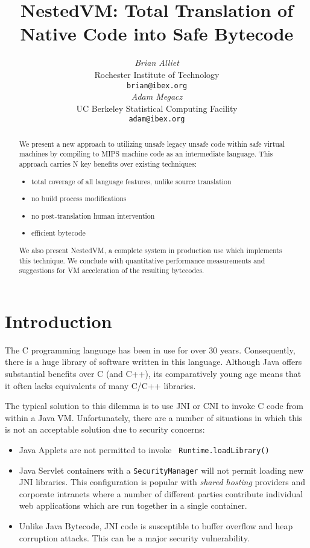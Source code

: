 \documentclass{acmconf}
\title{\textbf{\textsf{
NestedVM: Total Translation of Native Code into Safe Bytecode
}}}
\date{}
\author{\begin{tabular}{@{}c@{}}
        {\em {Brian Alliet}} \\
        {Rochester Institute of Technology}\\
        {\tt brian@ibex.org}
   \end{tabular}\hskip 1in\begin{tabular}{@{}c@{}}
        {\em {Adam Megacz}} \\
        {UC Berkeley Statistical Computing Facility} \\
        {\tt adam@ibex.org}
\end{tabular}}
\begin{document}
\maketitle

\begin{abstract}

We present a new approach to utilizing unsafe legacy unsafe code
within safe virtual machines by compiling to MIPS machine code as an
intermediate language.  This approach carries N key benefits over
existing techniques:

\begin{itemize}
\item total coverage of all language features, unlike source translation
\item no build process modifications
\item no post-translation human intervention
\item efficient bytecode
\end{itemize}

We also present NestedVM, a complete system in production use which
implements this technique.  We conclude with quantitative performance
measurements and suggestions for VM acceleration of the resulting
bytecodes.


\end{abstract}

\section{Introduction}

The C programming language \cite{KR} has been in use for over 30
years.  Consequently, there is a huge library of software written in
this language.  Although Java offers substantial benefits \cite{} over
C (and C++), its comparatively young age means that it often lacks
equivalents of many C/C++ libraries.

The typical solution to this dilemma is to use JNI \cite{} or CNI
\cite{} to invoke C code from within a Java VM.  Unfortunately, there
are a number of situations in which this is not an acceptable
solution due to security concerns:

\begin{itemize}

\item Java Applets are not permitted to invoke {\tt
      Runtime.loadLibrary()}

\item Java Servlet containers with a {\tt SecurityManager} will not
      permit loading new JNI libraries.  This configuration is popular
      with {\it shared hosting} providers and corporate intranets
      where a number of different parties contribute individual web
      applications which are run together in a single container.

\item Unlike Java Bytecode, JNI code is susceptible to buffer overflow
      and heap corruption attacks.  This can be a major security
      vulnerability.

\end{itemize}
\end{document}
